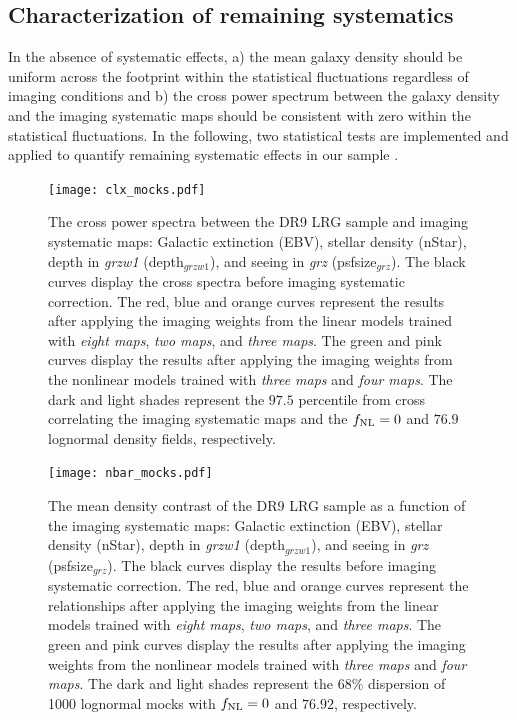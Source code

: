 \subsection{Characterization of remaining systematics}
\label{ssec:characterization}

In the absence of systematic effects, a) the mean galaxy density should be uniform across the footprint within the statistical fluctuations regardless of imaging conditions and b) the cross power spectrum between the galaxy density and the imaging systematic maps should be consistent with zero within the statistical fluctuations. In the following, two statistical tests are implemented and applied to quantify remaining systematic effects in our sample \cite[see, also,][]{rezaie2021primordial}.

\begin{figure}
\centering
\texttt{[image: clx\_mocks.pdf]}
\caption{The cross power spectra between the DR9 LRG sample and imaging systematic maps: Galactic extinction (EBV), stellar density (nStar), depth in \textit{grzw1} (depth$_{grzw1}$), and seeing in \textit{grz} (psfsize$_{grz}$). The black curves display the cross spectra before imaging systematic correction. The red, blue and orange curves represent the results after applying the imaging weights from the linear models trained with \textit{eight maps}, \textit{two maps}, and \textit{three maps}. The green and pink curves display the results after applying the imaging weights from the nonlinear models trained with \textit{three maps} and \textit{four maps}. The dark and light shades represent the $97.5$ percentile from cross correlating the imaging systematic maps and the $f_{\rm NL}=0$ and $76.9$ lognormal density fields, respectively.}\label{fig:clxmock}
\end{figure}

\begin{figure}
\centering
\texttt{[image: nbar\_mocks.pdf]}
\caption{The mean density contrast of the DR9 LRG sample as a function of the imaging systematic maps: Galactic extinction (EBV), stellar density (nStar), depth in \textit{grzw1} (depth$_{grzw1}$), and seeing in \textit{grz} (psfsize$_{grz}$). The black curves display the results before imaging systematic correction. The red, blue and orange curves represent the relationships after applying the imaging weights from the linear models trained with \textit{eight maps}, \textit{two maps}, and \textit{three maps}. The green and pink curves display the results after applying the imaging weights from the nonlinear models trained with \textit{three maps} and \textit{four maps}. The dark and light shades represent the $68\%$ dispersion of 1000 lognormal mocks with $f_{\rm NL}=0$ and $76.92$, respectively.}\label{fig:nbarmock}
\end{figure}


